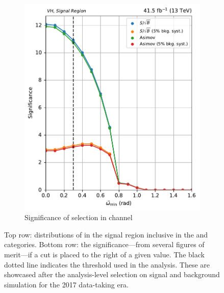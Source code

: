 \begin{figure}[htbp]
\begin{subfigure}[b]{0.46\textwidth}
        \includegraphics[width=\textwidth]{figures/category_optimisations/with_mindphi_cut/significance_VH_min_omega_tilde_all.pdf}
        \caption{Significance of selection in \VH channel}
    \end{subfigure}
    \caption[Distributions of \omegaTilde in the signal region inclusive in the \ttH and \VH categories, along with the significance---from several figures of merit---if a cut is placed to the right of a given value]{Top row: distributions of \omegaTilde in the signal region inclusive in the \ttH and \VH categories. Bottom row: the significance---from several figures of merit---if a cut is placed to the right of a given value. The black dotted line indicates the threshold used in the analysis. These are showcased after the analysis-level selection on signal and background simulation for the 2017 data-taking era.}
    \label{fig:htoinv_category_optimisations_significances}
\end{figure}

